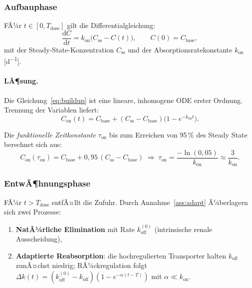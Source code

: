 ﻿\documentclass[12pt,a4paper]{article}
\theoremstyle{plain}
\theoremstyle{definition}
\theoremstyle{remark}
\begin{document}
\subsubsection{Aufbauphase}

FÃ¼r $t \in [0, T_\text{dose}]$ gilt die Differentialgleichung:
\begin{equation}
  \frac{\mathrm{d}C}{\mathrm{d}t} = k_\text{on}\bigl(C_\text{ss} - C(t)\bigr),
  \qquad C(0) = C_\text{base},
  \label{eq:buildup}
\end{equation}
mit der Steady-State-Konzentration $C_\text{ss}$ und der
Absorptionsratekonstante $k_\text{on}$ [\si{d^{-1}}].

\paragraph{LÃ¶sung.} Die Gleichung~\eqref{eq:buildup} ist eine
lineare, inhomogene ODE erster Ordnung. Trennung der Variablen liefert:
\begin{equation}
  \boxed{C_\text{on}(t) = C_\text{base} + (C_\text{ss} - C_\text{base})
    \bigl(1 - e^{-k_\text{on} t}\bigr).}
  \label{eq:C_on}
\end{equation}

Die \emph{funktionelle Zeitkonstante} $\tau_\text{on}$ bis zum Erreichen von
95\,\% des Steady State berechnet sich aus:
\begin{equation}
  C_\text{on}(\tau_\text{on}) = C_\text{base} + 0{,}95\,(C_\text{ss}-C_\text{base})
  \;\Longrightarrow\; \tau_\text{on} = \frac{-\ln(0{,}05)}{k_\text{on}} \approx \frac{3}{k_\text{on}}.
  \label{eq:tau_on}
\end{equation}

\subsubsection{EntwÃ¶hnungsphase}

FÃ¼r $t > T_\text{dose}$ entfÃ¤llt die Zufuhr. Durch Annahme~\ref{ass:adapt}
Ã¼berlagern sich zwei Prozesse:
\begin{enumerate}
  \item \textbf{NatÃ¼rliche Elimination} mit Rate $k_\text{off}^{(0)}$
        (intrinsische renale Ausscheidung),
  \item \textbf{Adaptierte Reabsorption}: die hochregulierten Transporter
        halten $k_\text{off}$ zunÃ¤chst niedrig; RÃ¼ckregulation folgt
        $\Delta k(t) = (k_\text{off}^{(0)} - k_\text{off})(1-e^{-\alpha(t-T)})$
        mit $\alpha \ll k_\text{on}$.
\end{enumerate}
\end{document}
